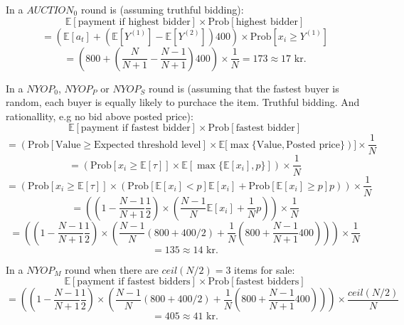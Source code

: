 \documentclass[a4paper,12pt]{article}
\begin{document}
	In a $AUCTION_0$ round is (assuming truthful bidding):
	\[ \mathbb{E}[\mbox{payment if highest bidder}] \times \mbox{Prob}[\mbox{highest bidder}] \] 
	\[  = \left( \mathbb{E}[a_t] + (\mathbb{E}[Y^{(1)}]-\mathbb{E}[Y^{(2)}]) 400 \right) \times \mbox{Prob}[x_i \ge Y^{(1)}] \] 
	\[	= \left( 800 + \left(\frac{N}{N+1} - \frac{N-1}{N+1}\right)400 \right) \times \frac{1}{N} = 173 \approx 17\mbox{ kr.} \]
	
	In a $NYOP_0$, $NYOP_P$ or $NYOP_S$ round is (assuming that the fastest buyer is random, each buyer is equally likely to purchace the item. Truthful bidding. And rationallity, e.g no bid above posted price):
	\[ \mathbb{E}[\mbox{payment if fastest bidder}] \times \mbox{Prob}[\mbox{fastest bidder}] \] 
	\[  = \left( \mbox{Prob}[\mbox{Value} \ge \mbox{Expected threshold level}] \times \mathbb{E}[\max\{\mbox{Value}, \mbox{Posted price}\} \right)] \times \frac{1}{N} \] 
	\[  = \left( \mbox{Prob}[x_i \ge \mathbb{E}[\tau]] \times \mathbb{E}[\max\{\mathbb{E}[x_i], p\}]  \right) \times \frac{1}{N} \] 
	\[  = \left( \mbox{Prob}[x_i \ge \mathbb{E}[\tau]] \times ( \mbox{Prob}[\mathbb{E}[x_i] < p] \mathbb{E}[x_i] + \mbox{Prob}[\mathbb{E}[x_i] \ge p] p ) \right) \times \frac{1}{N} \] 
	\[  = \left( \left(1-\frac{N-1}{N+1}\frac{1}{2}\right) \times \left( \frac{N-1}{N} \mathbb{E}[x_i] + \frac{1}{N} p \right) \right) \times \frac{1}{N} \] 
	\[  = \left( \left(1-\frac{N-1}{N+1}\frac{1}{2}\right) \times \left( \frac{N-1}{N} (800+400/2) + \frac{1}{N} \left(800+\frac{N-1}{N+1}400\right) \right) \right) \times \frac{1}{N} \] 
	\[	= 135 \approx 14\mbox{ kr.} \]
	
	In a $NYOP_M$ round when there are $ceil(N/2)=3$ items for sale:
	\[ \mathbb{E}[\mbox{payment if fastest bidders}] \times \mbox{Prob}[\mbox{fastest bidders}] \] 
	\[  = \left( \left(1-\frac{N-1}{N+1}\frac{1}{2}\right) \times \left( \frac{N-1}{N} (800+400/2) + \frac{1}{N} \left(800+\frac{N-1}{N+1}400\right) \right) \right) \times \frac{ceil(N/2)}{N} \] 
	\[	= 405 \approx 41\mbox{ kr.} \]
	
	
	\newpage
	\tableofcontents
\end{document}
